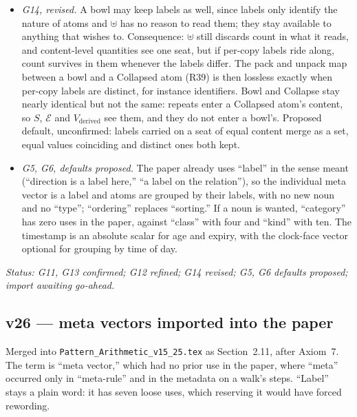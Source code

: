\documentclass[11pt]{article}
\begin{document}
\begin{itemize}
atom coherence is $0$. This is a candidate for R22: read an atom's single
$(r,\hat n)$ from $V_{\text{derived}}$, which the paper already allows
for operators that need one pair.
\item \emph{G14, revised.} A bowl may keep labels as well, since labels
only identify the nature of atoms and $\uplus$ has no reason to read them;
they stay available to anything that wishes to. Consequence: $\uplus$
still discards count in what it reads, and content-level quantities see
one seat, but if per-copy labels ride along, count survives in them
whenever the labels differ. The pack and unpack map between a bowl and a
Collapsed atom (R39) is then lossless exactly when per-copy labels are
distinct, for instance identifiers. Bowl and Collapse stay nearly
identical but not the same: repeats enter a Collapsed atom's content, so
$S$, $\mathcal{E}$ and $V_{\text{derived}}$ see them, and they do not
enter a bowl's. Proposed default, unconfirmed: labels carried on a seat of
equal content merge as a set, equal values coinciding and distinct ones
both kept.
\item \emph{G5, G6, defaults proposed.} The paper already uses ``label''
in the sense meant (``direction is a label here,'' ``a label on the
relation''), so the individual meta vector is a label and atoms are
grouped by their labels, with no new noun and no ``type''; ``ordering''
replaces ``sorting.'' If a noun is wanted, ``category'' has zero uses in
the paper, against ``class'' with four and ``kind'' with ten. The
timestamp is an absolute scalar for age and expiry, with the clock-face
vector optional for grouping by time of day.
\end{itemize}
\emph{Status: G11, G13 confirmed; G12 refined; G14 revised; G5, G6
defaults proposed; import awaiting go-ahead.}


\subsection*{v26 --- meta vectors imported into the paper}
Merged into \texttt{Pattern\_Arithmetic\_v15\_25.tex} as
Section~2.11, after Axiom~7. The term is ``meta vector,'' which had no
prior use in the paper, where ``meta'' occurred only in ``meta-rule''
and in the metadata on a walk's steps. ``Label'' stays a plain word: it
has seven loose uses, which reserving it would have forced rewording.
\end{document}
